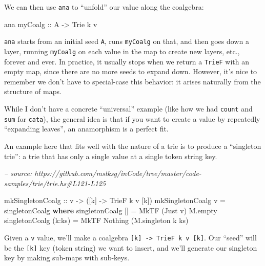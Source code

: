 \documentclass[]{article}
\newenvironment{Shaded}{}{}
\newcommand{\CommentTok}[1]{\textcolor[rgb]{0.38,0.63,0.69}{\textit{#1}}}
\newcommand{\DataTypeTok}[1]{\textcolor[rgb]{0.56,0.13,0.00}{#1}}
\newcommand{\FunctionTok}[1]{\textcolor[rgb]{0.02,0.16,0.49}{#1}}
\newcommand{\KeywordTok}[1]{\textcolor[rgb]{0.00,0.44,0.13}{\textbf{#1}}}
\newcommand{\NormalTok}[1]{#1}
\newcommand{\OtherTok}[1]{\textcolor[rgb]{0.00,0.44,0.13}{#1}}
\begin{document}
We can then use \texttt{ana} to ``unfold'' our value along the coalgebra:

\begin{Shaded}
\begin{Highlighting}[]
\NormalTok{ana}\OtherTok{ myCoalg ::} \DataTypeTok{A} \OtherTok{->} \DataTypeTok{Trie}\NormalTok{ k v}
\end{Highlighting}
\end{Shaded}

\texttt{ana} starts from an initial seed \texttt{A}, runs \texttt{myCoalg} on
that, and then goes down a layer, running \texttt{myCoalg} on each value in the
map to create new layers, etc., forever and ever. In practice, it usually stops
when we return a \texttt{TrieF} with an empty map, since there are no more seeds
to expand down. However, it's nice to remember we don't have to special-case
this behavior: it arises naturally from the structure of maps.

While I don't have a concrete ``universal'' example (like how we had
\texttt{count} and \texttt{sum} for \texttt{cata}), the general idea is that if
you want to create a value by repeatedly ``expanding leaves'', an anamorphism is
a perfect fit.

An example here that fits well with the nature of a trie is to produce a
``singleton trie'': a trie that has only a single value at a single token string
key.

\begin{Shaded}
\begin{Highlighting}[]
\CommentTok{-- source: https://github.com/mstksg/inCode/tree/master/code-samples/trie/trie.hs#L121-L125}

\OtherTok{mkSingletonCoalg ::}\NormalTok{ v }\OtherTok{->}\NormalTok{ ([k] }\OtherTok{->} \DataTypeTok{TrieF}\NormalTok{ k v [k])}
\NormalTok{mkSingletonCoalg v }\FunctionTok{=}\NormalTok{ singletonCoalg}
  \KeywordTok{where}
\NormalTok{    singletonCoalg []     }\FunctionTok{=} \DataTypeTok{MkTF}\NormalTok{ (}\DataTypeTok{Just}\NormalTok{ v) M.empty}
\NormalTok{    singletonCoalg (k}\FunctionTok{:}\NormalTok{ks) }\FunctionTok{=} \DataTypeTok{MkTF} \DataTypeTok{Nothing}\NormalTok{  (M.singleton k ks)}
\end{Highlighting}
\end{Shaded}

Given a \texttt{v} value, we'll make a coalgebra
\texttt{{[}k{]}\ -\textgreater{}\ TrieF\ k\ v\ {[}k{]}}. Our ``seed'' will be
the \texttt{{[}k{]}} key (token string) we want to insert, and we'll generate
our singleton key by making sub-maps with sub-keys.
\end{document}
